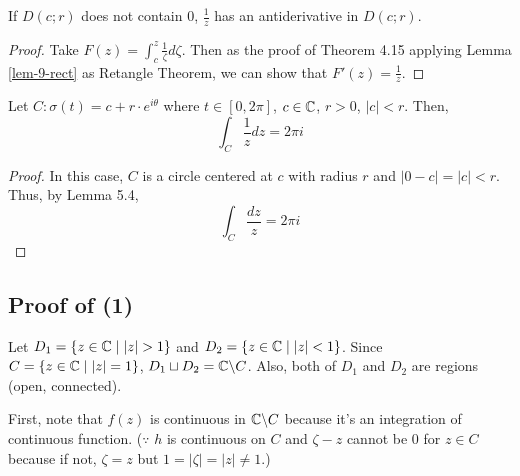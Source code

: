   \begin{lemma}\label{lem-9-anti}
    If \(D(c; r)\) does not contain \(0\), \(\frac{1}{z}\) has an antiderivative in \(D(c; r)\).
  \end{lemma}
  \begin{proof}
    Take \(F(z) = \int_{c}^{z} \frac{1}{\zeta} d\zeta\).
    Then as the proof of Theorem 4.15 applying Lemma \ref{lem-9-rect} as Retangle Theorem, we can show that \(F'(z) = \frac{1}{z}\).
  \end{proof}
  \begin{lemma}\label{lem-9-2-pi-i}
    Let \(C: \sigma(t) = c + r \cdot e^{i\theta}\) where \(t \in [0, 2\pi]\), \(c \in \mathbb{C}\), \(r > 0\), \(|c| < r\).
    Then,
    \[\int_{C} \frac{1}{z} dz = 2\pi i\]
  \end{lemma}
  \begin{proof}
    In this case, \(C\) is a circle centered at \(c\) with radius \(r\) and \(|0 - c| = |c| < r\). Thus, by Lemma 5.4,
    \[\int_{C} \frac{dz}{z} = 2\pi i\]
  \end{proof}

\subsection*{Proof of (1)}

  Let \(D_1 = \{z \in \mathbb{C} \mid |z| > 1\}\) and \(D_2 = \{z \in \mathbb{C} \mid |z| < 1\}\).
  Since \(C = \{z \in \mathbb{C} \mid |z| = 1\}\), \(D_1 \sqcup D_2 = \bbC \bs C\).
  Also, both of \(D_1\) and \(D_2\) are regions (open, connected).

  First, note that \(f(z)\) is continuous in \(\bbC \bs C\) because it's an integration of continuous function.
  (\(\because\) \(h\) is continuous on \(C\) and \(\zeta - z\) cannot be 0 for \(z \in C\) because if not, \(\zeta = z\) but \(1 = |\zeta| = |z| \neq 1\).)

